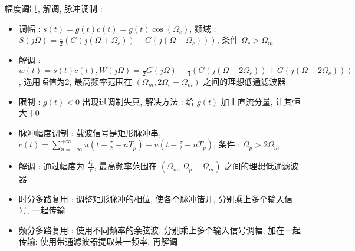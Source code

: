 \documentclass[UTF8, 12pt]{ctexart}
\begin{document}
	幅度调制, 解调, 脉冲调制 :
	\begin{itemize}[leftmargin = 4em]
		\item 调幅 : $ s(t) = g(t)c(t) = g(t)\cos(\Omega_{c}) $, 频域 : $ S(j\Omega) = \frac{1}{2}(G(j(\Omega+\Omega_{c}))+G(j(\Omega-\Omega_{c}))) $, 条件 $ \Omega_{c} > \Omega_{m} $
		\item 解调 : $ w(t) = s(t)c(t), W(j\Omega) = \frac{1}{2}G(j\Omega) + \frac{1}{4}(G(j(\Omega+2\Omega_{c}))+G(j(\Omega-2\Omega_{c}))) $, 选用幅值为2, 最高频率范围在 $ (\Omega_{m}, 2\Omega_{c}-\Omega_{m}) $ 之间的理想低通滤波器
		\item 限制 : $ g(t) < 0 $ 出现过调制失真, 解决方法 : 给 $ g(t) $ 加上直流分量, 让其恒大于0
		\item 脉冲幅度调制 : 载波信号是矩形脉冲串, $ c(t) = \sum\limits_{n=-\infty}^{+\infty}u(t+\frac{\tau}{2}-nT_{p})-u(t-\frac{\tau}{2}-nT_{p}) $, 条件 : $ \Omega_{p} > 2\Omega_{m} $
		\item 解调 : 通过幅度为 $ \frac{T_{p}}{\tau} $, 最高频率范围在 $ (\Omega_{m}, \Omega_{p}-\Omega_{m}) $ 之间的理想低通滤波器
		\item 时分多路复用 : 调整矩形脉冲的相位, 使各个脉冲错开, 分别乘上多个输入信号, 一起传输
		\item 频分多路复用 : 使用不同频率的余弦波, 分别乘上多个输入信号调幅, 加在一起传输; 使用带通滤波器提取某一频率, 再解调
	\end{itemize}
\end{document}
